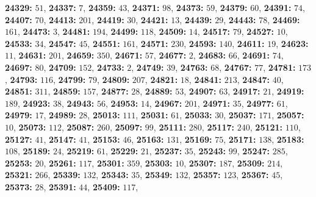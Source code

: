 \textsf{\bfseries 24329:} $51$, \textsf{\bfseries 24337:} $7$, \textsf{\bfseries 24359:} $43$, \textsf{\bfseries 24371:} $98$, \textsf{\bfseries 24373:} $59$, \textsf{\bfseries 24379:} $60$, \textsf{\bfseries 24391:} $74$, \textsf{\bfseries 24407:} $70$, \textsf{\bfseries 24413:} $201$, \textsf{\bfseries 24419:} $30$, \textsf{\bfseries 24421:} $13$, \textsf{\bfseries 24439:} $29$, \textsf{\bfseries 24443:} $78$, \textsf{\bfseries 24469:} $161$, \textsf{\bfseries 24473:} $3$, \textsf{\bfseries 24481:} $194$, \textsf{\bfseries 24499:} $118$, \textsf{\bfseries 24509:} $14$, \textsf{\bfseries 24517:} $79$, \textsf{\bfseries 24527:} $10$, \textsf{\bfseries 24533:} $34$, \textsf{\bfseries 24547:} $45$, \textsf{\bfseries 24551:} $161$, \textsf{\bfseries 24571:} $230$, \textsf{\bfseries 24593:} $140$, \textsf{\bfseries 24611:} $19$, \textsf{\bfseries 24623:} $11$, \textsf{\bfseries 24631:} $201$, \textsf{\bfseries 24659:} $350$, \textsf{\bfseries 24671:} $57$, \textsf{\bfseries 24677:} $2$, \textsf{\bfseries 24683:} $66$, \textsf{\bfseries 24691:} $74$, \textsf{\bfseries 24697:} $80$, \textsf{\bfseries 24709:} $152$, \textsf{\bfseries 24733:} $2$, \textsf{\bfseries 24749:} $39$, \textsf{\bfseries 24763:} $68$, \textsf{\bfseries 24767:} $77$, \textsf{\bfseries 24781:} $173$, \textsf{\bfseries 24793:} $116$, \textsf{\bfseries 24799:} $79$, \textsf{\bfseries 24809:} $207$, \textsf{\bfseries 24821:} $18$, \textsf{\bfseries 24841:} $213$, \textsf{\bfseries 24847:} $40$, \textsf{\bfseries 24851:} $311$, \textsf{\bfseries 24859:} $157$, \textsf{\bfseries 24877:} $28$, \textsf{\bfseries 24889:} $53$, \textsf{\bfseries 24907:} $63$, \textsf{\bfseries 24917:} $21$, \textsf{\bfseries 24919:} $189$, \textsf{\bfseries 24923:} $38$, \textsf{\bfseries 24943:} $56$, \textsf{\bfseries 24953:} $14$, \textsf{\bfseries 24967:} $201$, \textsf{\bfseries 24971:} $35$, \textsf{\bfseries 24977:} $61$, \textsf{\bfseries 24979:} $17$, \textsf{\bfseries 24989:} $28$, \textsf{\bfseries 25013:} $111$, \textsf{\bfseries 25031:} $61$, \textsf{\bfseries 25033:} $30$, \textsf{\bfseries 25037:} $171$, \textsf{\bfseries 25057:} $10$, \textsf{\bfseries 25073:} $112$, \textsf{\bfseries 25087:} $260$, \textsf{\bfseries 25097:} $99$, \textsf{\bfseries 25111:} $280$, \textsf{\bfseries 25117:} $240$, \textsf{\bfseries 25121:} $110$, \textsf{\bfseries 25127:} $41$, \textsf{\bfseries 25147:} $41$, \textsf{\bfseries 25153:} $46$, \textsf{\bfseries 25163:} $131$, \textsf{\bfseries 25169:} $75$, \textsf{\bfseries 25171:} $138$, \textsf{\bfseries 25183:} $108$, \textsf{\bfseries 25189:} $24$, \textsf{\bfseries 25219:} $61$, \textsf{\bfseries 25229:} $21$, \textsf{\bfseries 25237:} $35$, \textsf{\bfseries 25243:} $99$, \textsf{\bfseries 25247:} $285$, \textsf{\bfseries 25253:} $20$, \textsf{\bfseries 25261:} $117$, \textsf{\bfseries 25301:} $359$, \textsf{\bfseries 25303:} $10$, \textsf{\bfseries 25307:} $187$, \textsf{\bfseries 25309:} $214$, \textsf{\bfseries 25321:} $266$, \textsf{\bfseries 25339:} $132$, \textsf{\bfseries 25343:} $35$, \textsf{\bfseries 25349:} $132$, \textsf{\bfseries 25357:} $123$, \textsf{\bfseries 25367:} $45$, \textsf{\bfseries 25373:} $28$, \textsf{\bfseries 25391:} $44$, \textsf{\bfseries 25409:} $117$, 
